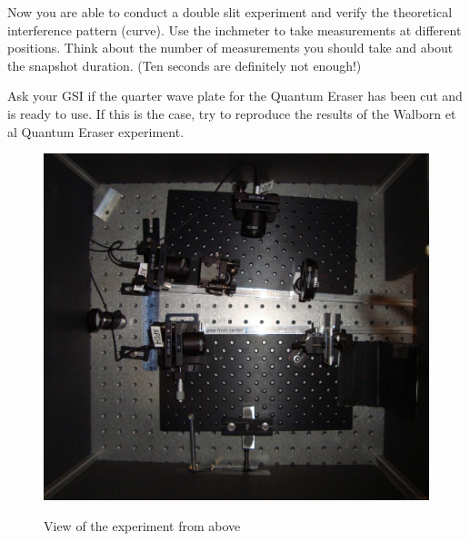 \documentclass{../lab}
\begin{document}
Now you are able to conduct a double slit experiment and verify the theoretical interference pattern (curve). Use the inchmeter to take measurements at different positions. Think about the number of measurements you should take and about the snapshot duration. (Ten seconds are definitely not enough!)

Ask your GSI if the quarter wave plate for the Quantum Eraser has been cut and is ready to use. If this is the case, try to reproduce the results of the Walborn et al Quantum Eraser experiment.

\noindent
\begin{figure}[H]
\captionsetup{justification=centering}
  \href{http://experimentationlab.berkeley.edu/sites/default/files/images/Qe_overview.jpeg}{\includegraphics[width=\linewidth,keepaspectratio]{images/Qe_overview.jpeg}}
  \caption{View of the experiment from above}
  \label{fig:Qe_overview.jpeg}
\endminipage\hfill
{}

\end{figure}
\end{document}
